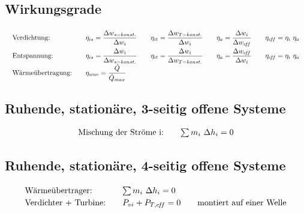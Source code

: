 \subsection{Wirkungsgrade}
%
	\skipabove{-25pt}
	\[ \arraycolsep=1em \def\arraystretch{2}
	\begin{array}{lllll}
		\text{Verdichtung:}      & \eta_{is} = \dfrac{\Delta w_{s=konst.}}{\Delta w_i} & \eta_{it} = \dfrac{\Delta w_{T=konst.}}{\Delta w_i} & \eta_a    = \dfrac{\Delta w_i}{\Delta w_{\eff}} & \eta_{\eff} = \eta_i \ \eta_a \\
		\text{Entspannung:}      & \eta_{is} = \dfrac{\Delta w_i}{\Delta w_{s=konst.}} & \eta_{it} = \dfrac{\Delta w_i}{\Delta w_{T=konst.}} & \eta_a    = \dfrac{\Delta w_{\eff}}{\Delta w_i} & \eta_{\eff} = \eta_i \ \eta_a \\
		\text{Wärmeübertragung:} & \eta_{wue} = \dfrac{\dot{Q}}{\dot{Q}_{max}}         &                                                     &                                                &
	\end{array} \]

\subsection{Ruhende, stationäre, 3-seitig offene Systeme}
%
	\skipabove{-15pt}
	\[ \arraycolsep=1em \def\arraystretch{1}
	\begin{array}{ll}
		\text{Mischung der Ströme i:} &  \sum m_i\ \Delta h_i = 0
	\end{array} \]

\subsection{Ruhende, stationäre, 4-seitig offene Systeme}
	\skipabove{-15pt}
	\[ \arraycolsep=1em \def\arraystretch{1.2}
	\begin{array}{lll}
		\text{Wärmeübertrager:}      & \sum m_i\ \Delta h_i = 0 &                                 \\
		\text{Verdichter + Turbine:} & P_{vi} + P_{T,\eff} = 0  & \text{montiert auf einer Welle}
	\end{array} \]

